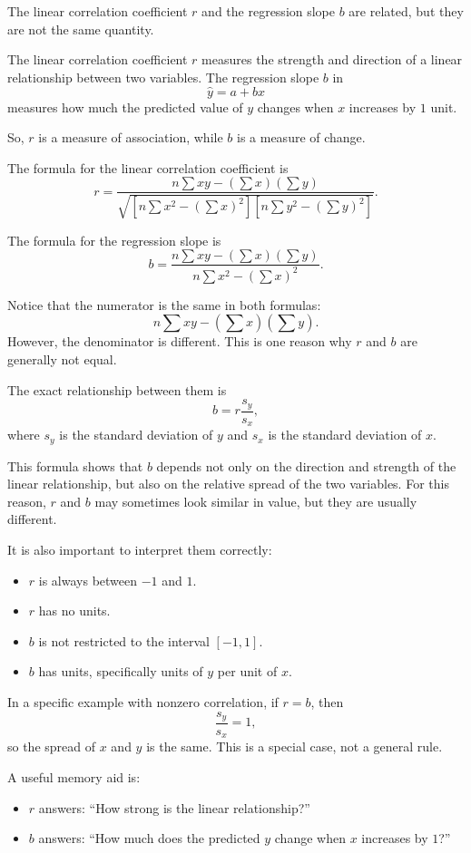 \documentclass[12pt]{article}
\begin{document}
	The linear correlation coefficient $r$ and the regression slope $b$ are related, but they are not the same quantity.
	
	The linear correlation coefficient $r$ measures the strength and direction of a linear relationship between two variables. The regression slope $b$ in
	\[
	\hat{y}=a+bx
	\]
	measures how much the predicted value of $y$ changes when $x$ increases by $1$ unit.
	
	So, $r$ is a measure of association, while $b$ is a measure of change.
	
	The formula for the linear correlation coefficient is
	\[
	r=
	\frac{n\sum xy-(\sum x)(\sum y)}
	{\sqrt{\left[n\sum x^2-(\sum x)^2\right]\left[n\sum y^2-(\sum y)^2\right]}}.
	\]
	
	The formula for the regression slope is
	\[
	b=
	\frac{n\sum xy-(\sum x)(\sum y)}
	{n\sum x^2-(\sum x)^2}.
	\]
	
	Notice that the numerator is the same in both formulas:
	\[
	n\sum xy-(\sum x)(\sum y).
	\]
	However, the denominator is different. This is one reason why $r$ and $b$ are generally not equal.
	
	The exact relationship between them is
	\[
	b=r\frac{s_y}{s_x},
	\]
	where $s_y$ is the standard deviation of $y$ and $s_x$ is the standard deviation of $x$.
	
	This formula shows that $b$ depends not only on the direction and strength of the linear relationship, but also on the relative spread of the two variables. For this reason, $r$ and $b$ may sometimes look similar in value, but they are usually different.
	
	It is also important to interpret them correctly:
	\begin{itemize}
		\item $r$ is always between $-1$ and $1$.
		\item $r$ has no units.
		\item $b$ is not restricted to the interval $[-1,1]$.
		\item $b$ has units, specifically units of $y$ per unit of $x$.
	\end{itemize}
	
	In a specific example with nonzero correlation, if $r=b$, then
	\[
	\frac{s_y}{s_x}=1,
	\]
	so the spread of $x$ and $y$ is the same. This is a special case, not a general rule.
	
	A useful memory aid is:
	\begin{itemize}
		\item $r$ answers: ``How strong is the linear relationship?''
		\item $b$ answers: ``How much does the predicted $y$ change when $x$ increases by $1$?''
	\end{itemize}
	
\end{document}
